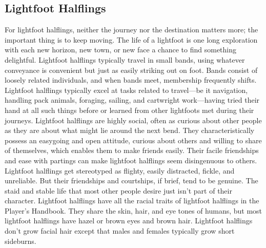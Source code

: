 \documentclass[10pt,a4paper,twoside,twocolumn,openany,bg=print,nodeprecatedcode]{dndbook}
\begin{document}
\subsection{Lightfoot Halflings}
For lightfoot halflings, neither the journey nor the destination matters more; the important thing is to keep moving. The life of a lightfoot is one long exploration with each new horizon, new town, or new face a chance to find something delightful.
Lightfoot halflings typically travel in small bands, using whatever conveyance is convenient but just as easily striking out on foot. Bands consist of loosely related individuals, and when bands meet, membership frequently shifts. Lightfoot halflings typically excel at tasks related to travel—be it navigation, handling pack animals, foraging, sailing, and cartwright work—having tried their hand at all such things before or learned from other lightfoots met during their journeys.
Lightfoot halflings are highly social, often as curious about other people as they are about what might lie around the next bend. They characteristically possess an easygoing and open attitude, curious about others and willing to share of themselves, which enables them to make friends easily. Their facile friendships and ease with partings can make lightfoot halflings seem disingenuous to others. Lightfoot halflings get stereotyped as flighty, easily distracted, fickle, and unreliable. But their friendships and courtships, if brief, tend to be genuine. The staid and stable life that most other people desire just isn't part of their character.
Lightfoot halflings have all the racial traits of lightfoot halflings in the Player's Handbook. They share the skin, hair, and eye tones of humans, but most lightfoot halflings have hazel or brown eyes and brown hair. Lightfoot halflings don't grow facial hair except that males and females typically grow short sideburns.
\end{document}
